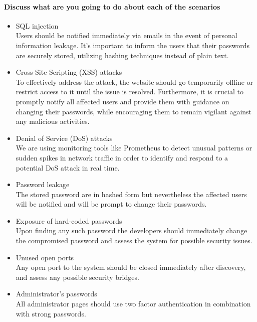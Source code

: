 \documentclass{article}
\begin{document}
	\paragraph{Discuss what are you going to do about each of the scenarios}
	\begin{itemize}
		\item SQL injection\\
		Users should be notified immediately via emails in the event of personal information leakage. It's important to inform the users that their passwords are securely stored, utilizing hashing techniques instead of plain text.
		\item Cross-Site Scripting (XSS) attacks\\
		To effectively address the attack, the website should go temporarily offline or restrict access to it until the issue is resolved. Furthermore, it is crucial to promptly notify all affected users and provide them with guidance on changing their passwords, while encouraging them to remain vigilant against any malicious activities.
		\item Denial of Service (DoS) attacks\\
		We are using monitoring tools like Prometheus to detect unusual patterns or sudden spikes in network traffic in order to identify and respond to a potential DoS attack in real time.
		\item Password leakage\\
		The stored password are in hashed form but nevertheless the affected users will be notified and will be prompt to change their passwords. 
		\item Exposure of hard-coded passwords\\
		Upon finding any such password the developers should immediately change the compromised password and assess the system for possible security issues.
		\item Unused open ports\\ 
		Any open port to the system should be closed immediately after discovery, and assess any possible security bridges.
		\item Administrator’s passwords\\
		All administrator pages should use two factor authentication in combination with strong passwords.
	\end{itemize}
\end{document}
